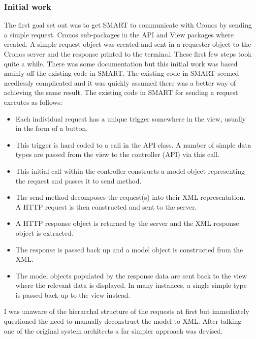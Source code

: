 \documentclass[a4paper, 11pt, titlepage]{article}
\begin{document}
\subsubsection{Initial work} 
The first goal set out was to get SMART to communicate with Cronos by sending a simple request. Cronos sub-packages in the API and View packages where created. A simple request object was created and sent in a requester object to the Cronos server and the response printed to the terminal. These first few steps took quite a while. There was some documentation but this initial work was based mainly off the existing code in SMART. The existing code in SMART seemed needlessly complicated and it was quickly assumed there was a better way of achieving the same result. The existing code in SMART for sending a request executes as follows: 
\begin{itemize} 
\item Each individual request has a unique trigger somewhere in the view, usually in the form of a button. 
\item This trigger is hard coded to a call in the API class. A number of simple data types are passed from the view to the controller (API) via this call. 
\item This initial call within the controller constructs a model object representing the request and passes it to send method. 
\item The send method decomposes the request(s) into their XML representation. A HTTP request is then constructed and sent to the server. 
\item A HTTP response object is returned by the server and the XML response object is extracted. 
\item The response is passed back up and a model object is constructed from the XML. 
\item The model objects populated by the response data are sent back to the view where the relevant data is displayed. In many instances, a single simple type is passed back up to the view instead. 
\end{itemize} 
I was unaware of the hierarchal structure of the requests at first but immediately questioned the need to manually deconstruct the model to XML. After talking one of the original system architects a far simpler approach was devised. 
\end{document}
